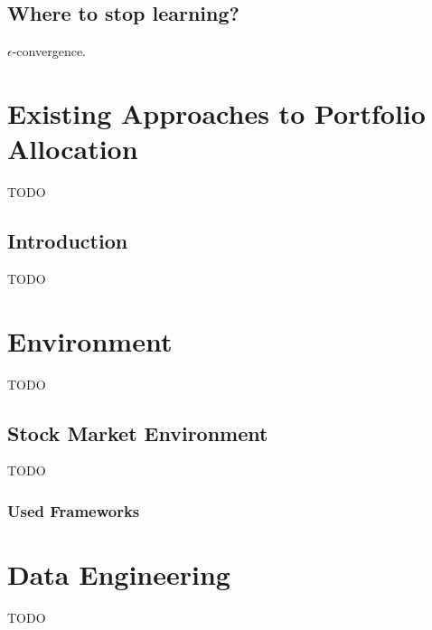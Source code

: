 \begin{itemize}
\section{Where to stop learning?}\label{sec:where-to-stop-learning}
$\epsilon$-convergence.








\chapter{Existing Approaches to Portfolio Allocation}\label{ch:existing-approaches-to-portfolio-allocation}
TODO


\section{Introduction}\label{sec:introduction}
TODO




\chapter{Environment}\label{ch:environment}
TODO


\section{Stock Market Environment}\label{sec:stock-market-environment}
TODO

\subsection{Used Frameworks}\label{subsec:used-frameworks}




\chapter{Data Engineering}\label{ch:data-engineering}
TODO



\end{itemize}
